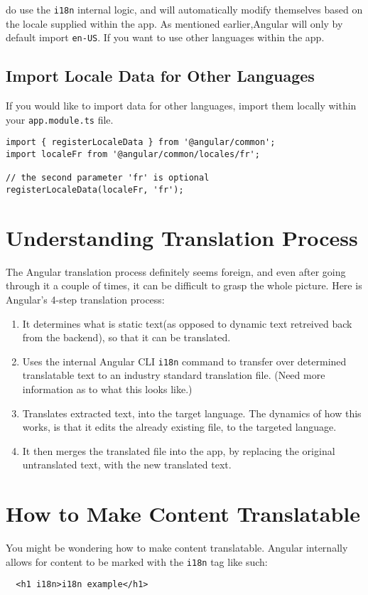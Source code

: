 do use the \lstinline{i18n} internal logic, and will automatically modify themselves based on the locale supplied within the app. As mentioned earlier,Angular will only by default import \lstinline{en-US}. If you want to use other languages within the app. 

\subsection{Import Locale Data for Other Languages}
If you would like to import data for other languages, import them locally within your \lstinline{app.module.ts} file. 

\begin{lstlisting}[caption=app.module.ts]
import { registerLocaleData } from '@angular/common';
import localeFr from '@angular/common/locales/fr';

// the second parameter 'fr' is optional
registerLocaleData(localeFr, 'fr');
\end{lstlisting}

\section{ Understanding Translation Process }
The Angular translation process definitely seems foreign, and even after going through it a couple of times, it can be difficult to grasp the whole picture. Here is Angular's 4-step translation process: 
\begin{enumerate}
  \item It determines what is static text(as opposed to dynamic text retreived back from the backend), so that it can be translated.
  \item Uses the internal Angular CLI \lstinline{i18n} command to transfer over determined translatable text to an industry standard translation file. (Need more information as to what this looks like.)
  \item Translates extracted text, into the target language. The dynamics of how this works, is that it edits the already existing file, to the targeted language. 
  \item It then merges the translated file into the app, by replacing the original untranslated text, with the new translated text. 
\end{enumerate}

\section{How to Make Content Translatable}
You might be wondering how to make content translatable. Angular internally allows for content to be marked with the \lstinline{i18n} tag like such: 
\begin{lstlisting}
  <h1 i18n>i18n example</h1>
\end{lstlisting}

